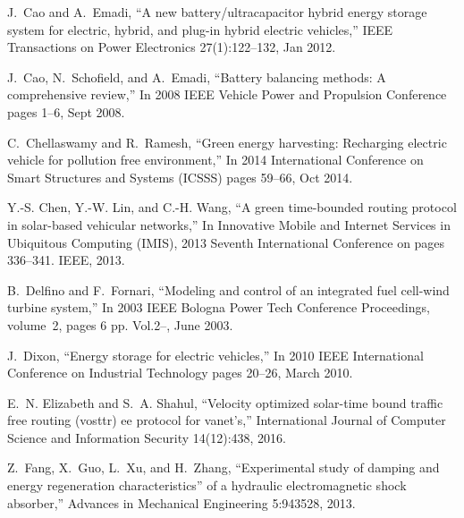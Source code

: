 J.~Cao and A.~Emadi,
\newblock ``A new battery/ultracapacitor hybrid energy storage system for
  electric, hybrid, and plug-in hybrid electric vehicles,''
\newblock IEEE Transactions on Power Electronics 27(1):122--132, Jan
  2012.

J.~Cao, N.~Schofield, and A.~Emadi,
\newblock ``Battery balancing methods: A comprehensive review,''
\newblock In 2008 IEEE Vehicle Power and Propulsion Conference pages
  1--6, Sept 2008.

C.~Chellaswamy and R.~Ramesh,
\newblock ``Green energy harvesting: Recharging electric vehicle for pollution
  free environment,''
\newblock In 2014 International Conference on Smart Structures and Systems
  (ICSSS) pages 59--66, Oct 2014.

Y.-S. Chen, Y.-W. Lin, and C.-H. Wang,
\newblock ``A green time-bounded routing protocol in solar-based vehicular
  networks,''
\newblock In Innovative Mobile and Internet Services in Ubiquitous
  Computing (IMIS), 2013 Seventh International Conference on pages 336--341.
  IEEE, 2013.

B.~Delfino and F.~Fornari,
\newblock ``Modeling and control of an integrated fuel cell-wind turbine system,''
\newblock In 2003 IEEE Bologna Power Tech Conference Proceedings,
  volume~2, pages 6 pp. Vol.2--, June 2003.

J.~Dixon,
\newblock ``Energy storage for electric vehicles,''
\newblock In 2010 IEEE International Conference on Industrial Technology
  pages 20--26, March 2010.

E.~N. Elizabeth and S.~A. Shahul,
\newblock ``Velocity optimized solar-time bound traffic free routing (vosttr) ee
  protocol for vanet's,''
\newblock International Journal of Computer Science and Information
  Security 14(12):438, 2016.

Z.~Fang, X.~Guo, L.~Xu, and H.~Zhang,
\newblock ``Experimental study of damping and energy regeneration characteristics''
  of a hydraulic electromagnetic shock absorber,''
\newblock Advances in Mechanical Engineering 5:943528, 2013.


